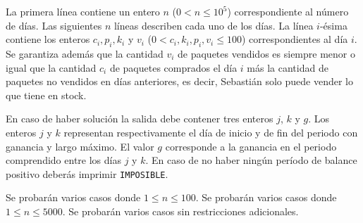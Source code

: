 \documentclass{oci}
\begin{document}
\begin{inputDescription}
La primera línea contiene un entero $n$ ($0 < n \leq 10^5$) correspondiente al número de días.
Las siguientes $n$ líneas describen cada uno de los días.
La línea $i$-ésima contiene los enteros $c_i, p_i, k_i$ y $v_i$ ($0 < c_i, k_i, p_i, v_i \leq 100$)
correspondientes al día $i$.
Se garantiza además que la cantidad $v_i$ de paquetes vendidos es siempre menor o igual
que la cantidad $c_i$ de paquetes comprados el día $i$ más la cantidad de paquetes no vendidos
en días anteriores, es decir, Sebastián solo puede vender lo que tiene en stock.
\end{inputDescription}

\begin{outputDescription}
En caso de haber solución la salida debe contener tres enteros $j$, $k$ y $g$.
Los enteros $j$ y $k$ representan respectivamente el día de inicio y de fin del periodo con ganancia
y largo máximo.
El valor $g$ corresponde a la ganancia en el periodo comprendido entre los días $j$ y $k$.
En caso de no haber ningún período de balance positivo deberás imprimir \verb|IMPOSIBLE|.
\end{outputDescription}

\begin{scoreDescription}
  Se probarán varios casos donde $1 \leq n \leq 100$.
  Se probarán varios casos donde $1 \leq n \leq 5000$.
  Se probarán varios casos sin restricciones adicionales.
\end{scoreDescription}

\begin{sampleDescription}
\end{sampleDescription}
\end{document}
